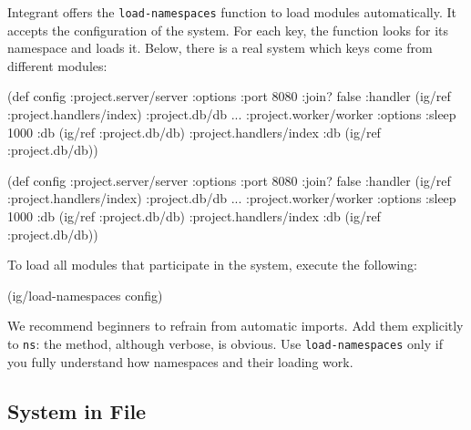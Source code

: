 

Integrant offers the \verb|load-namespaces| function to load modules automatically. It accepts the configuration of the system. For each key, the function looks for its namespace and loads it. Below, there is a real system which keys come from different modules:

\ifnarrow

\begin{english}
  \begin{clojure}
(def config
  {:project.server/server
   {:options {:port 8080 :join? false}
    :handler (ig/ref
               :project.handlers/index)}
   :project.db/db {...}
   :project.worker/worker
   {:options {:sleep 1000}
    :db      (ig/ref :project.db/db)}
   :project.handlers/index
   {:db (ig/ref :project.db/db)}})
  \end{clojure}
\end{english}

\else

\begin{english}
  \begin{clojure}
(def config
  {:project.server/server
   {:options {:port 8080 :join? false}
    :handler (ig/ref :project.handlers/index)}
   :project.db/db {...}
   :project.worker/worker
   {:options {:sleep 1000}
    :db      (ig/ref :project.db/db)}
   :project.handlers/index
   {:db (ig/ref :project.db/db)}})
  \end{clojure}
\end{english}

\fi

\noindent
To load all modules that participate in the system, execute the following:

\begin{english}
  \begin{clojure}
(ig/load-namespaces config)
  \end{clojure}
\end{english}

We recommend beginners to refrain from automatic imports. Add them explicitly to \verb|ns|: the method, although verbose, is obvious. Use \verb|load-namespaces| only if you fully understand how namespaces and their loading work.

\subsection{System in File}


